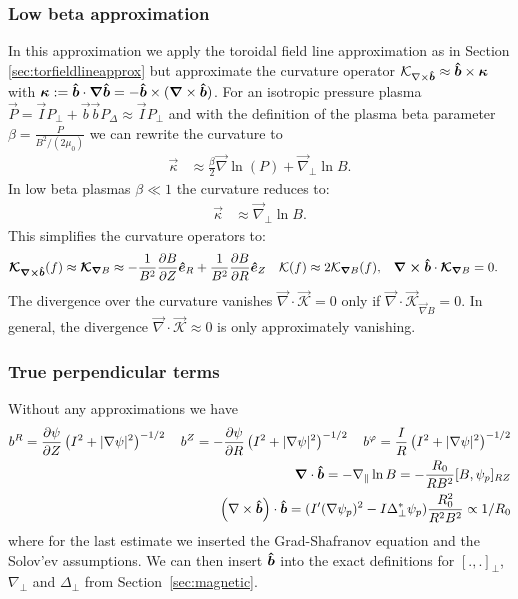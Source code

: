 \subsubsection{Low beta approximation}\label{sec:lowbetaapprox}
In this approximation we apply the toroidal field line approximation
as in Section
\ref{sec:torfieldlineapprox}
but approximate the curvature operator $\mathcal K_{\nabla\times\bm{\hat{b}}} \approx \bm{\hat{b}}\times{\boldsymbol{\kappa}}$
  with
  ${\boldsymbol{\kappa}} := \bm{\hat{b}} \cdot {\boldsymbol{\nabla}}\bm{\hat{b}} = -\bm{\hat{b}} \times({\boldsymbol{\nabla}}\times \bm{\hat{b}})$.
For an isotropic pressure plasma \(\vec{P} = \vec{I} P_\perp + \vec{b} \vec{b} P_\Delta \approx \vec{I} P_\perp\) and with the definition of the plasma beta parameter
\(\beta = \frac{P}{B^2/(2 \mu_0) } \)
we can rewrite the curvature to
\begin{align}
    \vec{\kappa} &\approx \frac{\beta}{2} \vec{\nabla} \ln(P) +\vec{\nabla}_\perp \ln{B} .
\end{align}
In low beta plasmas \(\beta\ll1\) the curvature reduces to:
\begin{align}
    \vec{\kappa} & \approx \vec{\nabla}_\perp \ln{B} .
\end{align}
This simplifies the curvature operators to:
\begin{align}
{\boldsymbol{\mathcal{K}_{{\nabla\times\bm{\hat{b}}}}}}(f) \approx
{\boldsymbol{ \mathcal{K} }}_{{\boldsymbol{\nabla}}  B}  &\approx  -\frac{1}{B^2}\frac{\partial B}{\partial Z}\bm{\hat{e}}_R +\frac{1}{B^2} \frac{\partial B}{\partial R}\bm{\hat{e}}_Z &
\mathcal{K} (f) &\approx 2\mathcal{K}_{{\boldsymbol{\nabla}}  B} (f) , &
    {\boldsymbol{{\nabla\times\bm{\hat{b}}}}} \cdot {\boldsymbol{\mathcal{K}}}_{{\boldsymbol{\nabla}}  B} &= 0.
\end{align}
The divergence over the curvature vanishes \( \vec{\nabla} \cdot \vec{ \mathcal{K} } = 0\) only if \( \vec{\nabla} \cdot \vec{ \mathcal{K}}_{\vec{\nabla}  B}   = 0\).
In general, the divergence \( \vec{\nabla} \cdot \vec{ \mathcal{K} } \approx 0\) is only approximately vanishing.
\subsubsection{True perpendicular terms}

Without any approximations we have
\begin{align}
b^R = {\frac{\partial \psi}{\partial Z}}\left(I^2+|\nabla\psi|^2\right)^{-1/2} \quad
b^Z = -{\frac{\partial \psi}{\partial R}}\left(I^2+|\nabla\psi|^2\right)^{-1/2} \quad 
b^\varphi = \frac{I}{R}\left(I^2+|\nabla\psi|^2\right)^{-1/2} \\
{\boldsymbol{\nabla}}\cdot\bm{\hat{b}} = -\nabla_\parallel \ln B = -\frac{R_0}{R B^2}[B,\psi_p]_{RZ} \\
\left({\nabla\times\bm{\hat{b}}}\right) \cdot\bm{\hat{b}} =
    (I'(\nabla\psi_p)^2 - I \Delta_\perp^* \psi_p)\frac{ R_0^2}{R^2B^2} \propto 1/R_0
\label{}
\end{align}
where for the last
estimate we inserted the Grad-Shafranov equation and the Solov'ev assumptions.
We can then insert $\bm{\hat{b}}$ into the exact definitions for $[.,.]_\perp$, $\nabla_\perp$ and $\Delta_\perp$ from Section~\ref{sec:magnetic}.

